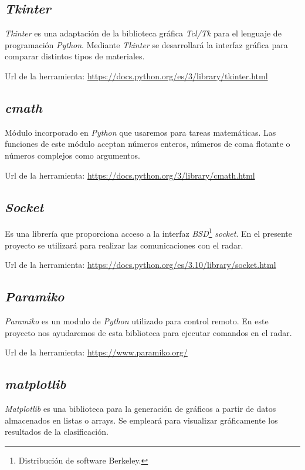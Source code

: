 \subsection{\textit{Tkinter}}

\textit{Tkinter} es una adaptación de la biblioteca gráfica \textit{Tcl/Tk} \cite{Tcl} para el lenguaje de programación \textit{Python}. Mediante \textit{Tkinter} se desarrollará la interfaz gráfica para comparar distintos tipos de materiales.

Url de la herramienta: \url{https://docs.python.org/es/3/library/tkinter.html}

\subsection{\textit{cmath}}
Módulo incorporado en \textit{Python} que usaremos para tareas matemáticas. Las funciones de este módulo aceptan números enteros, números de coma flotante o números complejos como argumentos.

Url de la herramienta: \url{https://docs.python.org/3/library/cmath.html}

\subsection{\textit{Socket}}
Es una librería que proporciona acceso a la interfaz \textit{BSD}\footnote{Distribución de software Berkeley.} \textit{socket}. En el presente proyecto se utilizará para realizar las comunicaciones con el radar.

Url de la herramienta: \url{https://docs.python.org/es/3.10/library/socket.html}

\subsection{\textit{Paramiko}}
\textit{Paramiko} es un modulo de \textit{Python} utilizado para control remoto. En este proyecto nos ayudaremos de esta biblioteca para ejecutar comandos en el radar.

Url de la herramienta: \url{https://www.paramiko.org/}

\subsection{\textit{matplotlib}}
\textit{Matplotlib} es una biblioteca para la generación de gráficos a partir de datos almacenados en listas o arrays. Se empleará para visualizar gráficamente los resultados de la clasificación.

